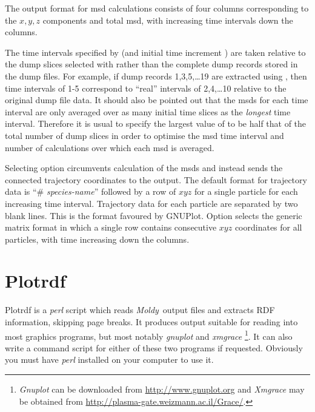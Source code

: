 \documentclass[a4paper,twoside]{report}
\newcommand{\moldy}{\emph{Moldy}}
\begin{document}
The output format for msd calculations consists of four columns
corresponding to the $x, y, z$ components and total msd, with
increasing time intervals down the columns.

The time intervals specified by  (and initial time increment
) are taken relative to the dump slices selected with 
rather than the complete dump records stored in the dump files. For
example, if dump records 1,3,5,\ldots{}19 are extracted using , then
time intervals of  1-5 correspond to ``real'' intervals of
2,4,\ldots{}10 relative to the original dump file data. It should also be
pointed out that the msds for each time interval are only averaged
over as many initial time slices as the \emph{longest} time interval.
Therefore it is usual to specify the largest value of  to be
half that of the total number of dump slices in order to optimise the
msd time interval and number of calculations over which each msd is
averaged.

Selecting option   circumvents calculation of the msds and
instead sends the connected trajectory coordinates to the output. The
default format for trajectory data is ``\# \textit{species-name}'' followed by a
row of $x y z$ for a single particle for each increasing time interval.
Trajectory data for each particle are separated by two blank lines.
This is the format favoured by GNUPlot. Option   selects
the generic matrix format in which a single row contains consecutive $x
y z$ coordinates for all particles, with time increasing down the
columns.

\section{Plotrdf}%
Plotrdf is a \emph{perl} script which reads \moldy\ output files and
extracts RDF information, skipping page breaks.  It produces output
suitable for reading into most graphics programs, but most notably
\emph{gnuplot} and \emph{xmgrace}%
\footnote{\emph{Gnuplot} can be downloaded from
  \url{http://www.gnuplot.org} and
\emph{Xmgrace} may be obtained from
\url{http://plasma-gate.weizmann.ac.il/Grace/}.}.
It can also write a command script
for either of these two programs if requested.  Obviously you must
have \emph{perl} installed on your computer to use it.
\end{document}
